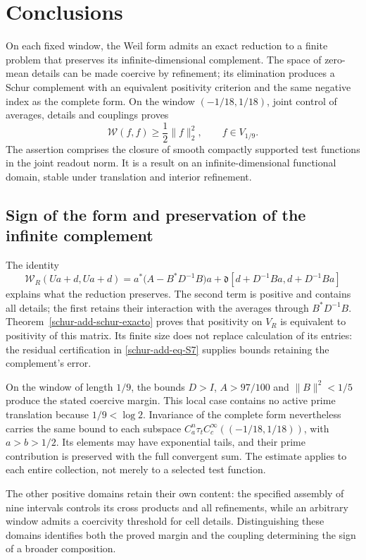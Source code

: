 \section{Conclusions}
\label{rz:conclusiones}

On each fixed window, the Weil form admits an exact
reduction to a finite problem that preserves its
infinite-dimensional complement. The space of zero-mean
details can be made coercive by refinement; its elimination
produces a Schur complement with an equivalent positivity
criterion and the same negative index as the complete form. On the window
$(-1/18,1/18)$, joint control of averages, details and
couplings proves
\[
\mathscr W(f,f)\geq\frac12\|f\|_2^2,
\qquad f\in V_{1/9}.
\]
The assertion comprises the closure of smooth compactly
supported test functions in the joint readout norm.
It is a result on an infinite-dimensional functional
domain, stable under translation and interior refinement.

\subsection*{Sign of the form and preservation of the infinite complement}

The identity
\[
\mathscr W_R(Ua+d,Ua+d)
=a^*\bigl(A-B^*D^{-1}B\bigr)a
+\mathfrak d[d+D^{-1}Ba,d+D^{-1}Ba]
\]
explains what the reduction preserves. The second term
is positive and contains all details; the first retains
their interaction with the averages through $B^*D^{-1}B$.
Theorem~\ref{schur-add-schur-exacto} proves that positivity
on $V_R$ is equivalent to positivity of this matrix.
Its finite size does not replace calculation of its
entries: the residual certification in
\eqref{schur-add-eq-S7} supplies bounds retaining the
complement's error.

On the window of length $1/9$, the bounds
$D>I$, $A>97/100$ and $\|B\|^2<1/5$ produce the stated
coercive margin. This local case contains no active prime
translation because $1/9<\log2$. Invariance of the
complete form nevertheless carries the same bound to
each subspace $C_a^n\tau_t C_c^\infty((-1/18,1/18))$,
with $a>b>1/2$. Its elements may have exponential tails,
and their prime contribution is preserved with the full
convergent sum. The estimate applies to each entire
collection, not merely to a selected test function.

The other positive domains retain their own content:
the specified assembly of nine intervals controls its
cross products and all refinements, while an arbitrary
window admits a coercivity threshold for cell details.
Distinguishing these domains identifies both the proved
margin and the coupling determining the sign of a
broader composition.

